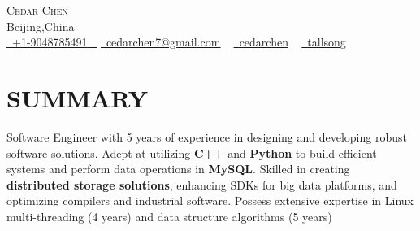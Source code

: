 \documentclass[a4paper,20pt]{article}
\newcommand{\resumeSubHeadingListStart}{\begin{itemize}[leftmargin=0.0in, label={}]}
\newcommand{\resumeSubHeadingListEnd}{\end{itemize}}
\begin{document}
\vfill


\begin{center}
    {\Huge \scshape Cedar Chen}  \href{https://tallsong.github.io/}{\raisebox{0.7\height}\faExternalLink }     \\ \vspace{1pt}
    Beijing,China \\ \vspace{1pt}
    \small \href{tel:+19048785401}{ \raisebox{-0.1\height}\faPhone\ \underline{+1-9048785491} ~} \href{mailto:cedarchen7@gmail.com}{\raisebox{-0.2\height}\faEnvelope\  \underline{cedarchen7@gmail.com}} ~ 
    \href{https://linkedin.com/in/cedarchen}{\raisebox{-0.2\height}\faLinkedinSquare\ \underline{cedarchen}}  ~
    \href{https://github.com/tallsong}{\raisebox{-0.2\height}\faGithub\ \underline{tallsong}} ~    
    \vspace{-8pt}
\end{center}





\section{SUMMARY}

Software Engineer with 5 years of experience in designing and developing robust software solutions. Adept at utilizing \textbf{C++} and \textbf{Python} to build efficient systems and perform data operations in \textbf{MySQL}. Skilled in creating \textbf{distributed storage solutions}, enhancing SDKs for big data platforms, and optimizing compilers and industrial software. Possess extensive expertise in Linux multi-threading (4 years) and data structure algorithms (5 years)

        \vspace*{2.0\multicolsep}

\vspace{10pt}
\vspace{-12pt}
\end{document}
